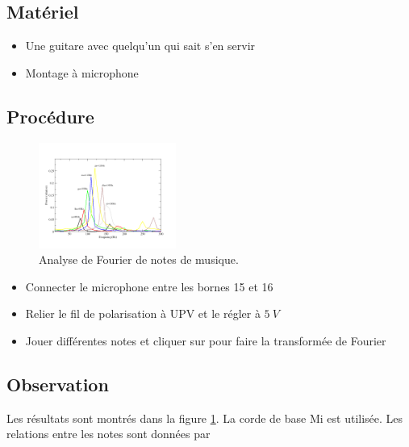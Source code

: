 \documentclass{book}
\begin{document}
\subsection{Matériel}


\begin{itemize}
  \item Une guitare avec quelqu'un qui sait s'en servir
  \item Montage à microphone
\end{itemize}

\subsection{Procédure}


\begin{figure}[h!]
\begin{center}
\caption{\label{fig:Fourier-analysis-of-Music}Analyse de Fourier de notes de musique. }\vspace{0.5em}
\includegraphics[width=0.4\textwidth, height=0.3\textwidth, keepaspectratio]{Pic-sariga.png}
\end{center}
\end{figure}



\begin{itemize}
  \item Connecter le microphone entre les bornes 15 et 16
  \item Relier le fil de polarisation à UPV et le régler à $5\ V$
  \item Jouer différentes notes et cliquer sur   pour faire la transformée de Fourier
\end{itemize}

\subsection{Observation}


Les résultats sont montrés dans la figure  \ref{fig:Fourier-analysis-of-Music}. La corde de base Mi est utilisée. Les relations entre les notes sont données par
\end{document}
